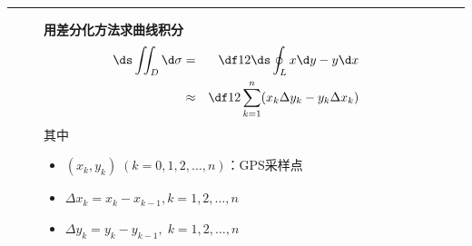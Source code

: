 \bigskip

\hrule

\bigskip

\begin{figure}[htbp]%
	\centering
	\begin{minipage}{0.4\textwidth}
		\centering
	\end{minipage}
	\begin{minipage}{0.5\textwidth}
		{\bf 用差分化方法求曲线积分}
		\begin{eqnarray*}
			\ds\iint_D\d\sigma&=&\df12\ds\oint_Lx\d y-y\d x\\
			&\approx&\df12\sum\limits_{k=1}^n(x_k\Delta y_k-y_k\Delta x_k)
		\end{eqnarray*}
		其中
		\begin{itemize}
		  \item $(x_k,y_k)\;(k=0,1,2,\ldots,n)$：GPS采样点
		  \item $\Delta x_k=x_k-x_{k-1},k=1,2,\ldots,n$
		  \item $\Delta y_k=y_k-y_{k-1},\;k=1,2,\ldots,n$
		\end{itemize}
	\end{minipage}
\end{figure}

